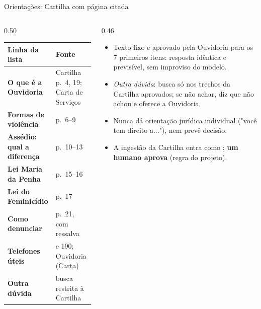 \documentclass[aspectratio=169,10pt]{beamer}
\newcommand{\code}[1]{\texttt{\detokenize{#1}}}
\begin{document}
\begin{frame}{Orientações: Cartilha com página citada}
\begin{columns}[T]
\begin{column}{0.50\textwidth}
\scriptsize
\begin{tabularx}{\linewidth}{@{}>{\bfseries}p{3.1cm}>{\raggedright\arraybackslash}X@{}}
\toprule
Linha da lista & Fonte \\
\midrule
O que é a Ouvidoria & Cartilha p.~4, 19; Carta de Serviços \\
Formas de violência & p.~6--9 \\
Assédio: qual a diferença & p.~10--13 \\
Lei Maria da Penha & p.~15--16 \\
Lei do Feminicídio & p.~17 \\
Como denunciar & p.~21, com ressalva \\
Telefones úteis & 180 e 190; Ouvidoria (Carta) \\
Outra dúvida & busca restrita à Cartilha \\
\bottomrule
\end{tabularx}
\end{column}
\begin{column}{0.46\textwidth}
\begin{itemize}\small\setlength\itemsep{4pt}
  \item \alert{Texto fixo e aprovado} pela Ouvidoria para os 7 primeiros itens: resposta idêntica e previsível, sem improviso do modelo.
  \item \alert{\emph{Outra dúvida}:} busca só nos trechos da Cartilha aprovados; se não achar, diz que não achou e oferece a Ouvidoria.
  \item Nunca dá orientação jurídica individual ("você tem direito a..."), nem prevê decisão.
  \item A ingestão da Cartilha entra como \code{pending_review}; \textbf{um humano aprova} (regra do projeto).
\end{itemize}
\end{column}
\end{columns}
\end{frame}
\end{document}
